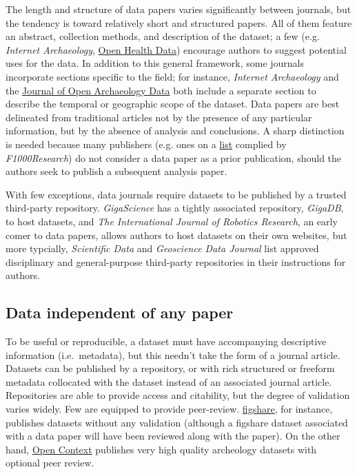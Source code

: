 \documentclass[10pt,a4paper,twocolumn]{article}
\begin{document}
The length and structure of data papers varies significantly between journals, but the tendency is toward relatively short and structured papers.
All of them feature an abstract, collection methods, and description of the dataset; a few (e.g. \emph{Internet Archaeology}, \href{http://openhealthdata.metajnl.com/about/submissions#authorGuidelines}{Open Health Data}) encourage authors to suggest potential uses for the data.
In addition to this general framework, some journals incorporate sections specific to the field; for instance, \emph{Internet Archaeology} and the \href{http://openarchaeologydata.metajnl.com/}{Journal of Open Archaeology Data} both include a separate section to describe the  temporal or geographic scope of the dataset.
Data papers are best delineated from traditional articles not by the presence of any particular information, but by the absence of analysis and conclusions.
A sharp distinction is needed because many publishers (e.g. ones on a \href{https://f1000research.com/data-policies}{list} complied by \emph{F1000Research}) do not consider a data paper as a prior publication, should the authors seek to publish a subsequent analysis paper.

With few exceptions, data journals require datasets to be published by a trusted third-party repository. 
\emph{GigaScience} has a tightly associated repository, \emph{GigaDB}, to host datasets, and \emph{The International Journal of Robotics Research}\cite{international_journal_of_robotics_research}, an early comer to data papers\cite{newman_data_2009}, allows authors to host datasets on their own websites, but more typcially, \emph{Scientific Data} and \emph{Geoscience Data Journal} list approved disciplinary and general-purpose third-party repositories in their instructions for authors.

\subsection*{Data independent of any paper}\label{paper-independent-data}

To be useful or reproducible, a dataset must have accompanying descriptive information (i.e.~metadata), but this needn't take the form of a journal article. 
Datasets can be published by a repository, or with rich structured or freeform metadata collocated with the dataset instead of an associated journal article. Repositories are able to provide access and citability, but the degree of validation varies widely. 
Few are equipped to provide peer-review. \href{http://figshare.com/}{figshare}, for instance, publishes datasets without any validation (although a figshare dataset associated with a data paper will have been reviewed along with the paper). 
On the other hand, \href{http://opencontext.org/}{Open Context} publishes very high quality archeology datasets with optional peer review.
\end{document}
